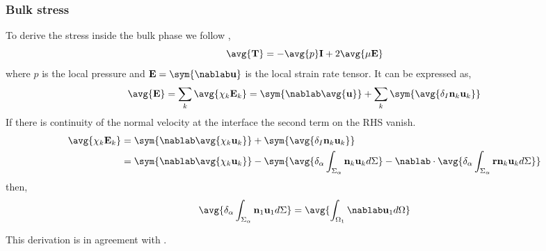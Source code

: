 \subsubsection*{Bulk stress }
To derive the stress inside the bulk phase we follow , 
\begin{equation*}
    \avg{\textbf{T}}
    =  - \avg{p}\textbf{I}
    +2 \avg{\mu \textbf{E}}
\end{equation*}
where $p$ is the local pressure and $\textbf{E} = \sym{\nablab \textbf{u}}$ is the local strain rate tensor. 
It can be expressed as, 
\begin{equation*}
    \avg{\textbf{E}} 
    = \sum_k \avg{\chi_k\textbf{E}_k} 
    = \sym{\nablab \avg{\textbf{u}}} 
    + \sum_k \sym{\avg{\delta_I \textbf{n}_k \textbf{u}_k}}
\end{equation*}
If there is continuity of the normal velocity at the interface the second term on the RHS vanish. 
\begin{align*}
    \avg{\chi_k\textbf{E}_k} 
    &= \sym{\nablab \avg{\chi_k\textbf{u}_k}} 
    + \sym{\avg{\delta_I \textbf{n}_k \textbf{u}_k}}\\
    &= \sym{\nablab \avg{\chi_k\textbf{u}_k}} 
    - \sym{
        \avg{\delta_\alpha\int_{\Sigma_\alpha} \textbf{n}_k \textbf{u}_k d\Sigma}
        - \nablab\cdot\avg{\delta_\alpha\int_{\Sigma_\alpha} \textbf{r}\textbf{n}_k \textbf{u}_k d\Sigma}
        }
\end{align*}
then, 
\begin{equation*}
    \avg{\delta_\alpha\int_{\Sigma_\alpha} \textbf{n}_1 \textbf{u}_1 d\Sigma}
    = 
    \avg{
        \int_{\Omega_1} \nablab \textbf{u}_1 d\Omega
    }
\end{equation*}

This derivation is in agreement with \citet{zhang1997momentum}. 



